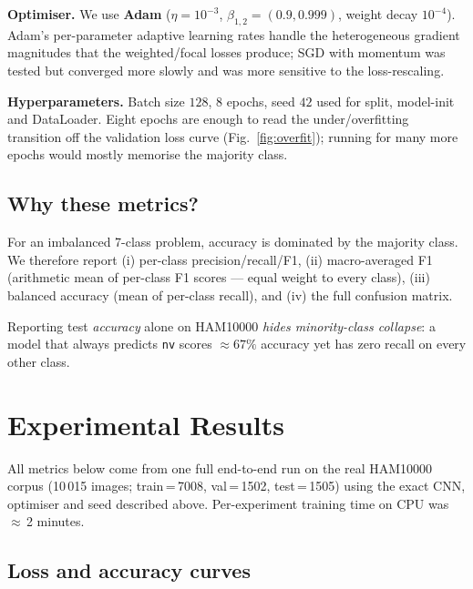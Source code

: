 \documentclass[11pt,a4paper]{article}
\theoremstyle{definition}
\begin{document}
\textbf{Optimiser.} We use \textbf{Adam} \cite{kingma2014adam}
($\eta=10^{-3}$, $\beta_{1{,}2}=(0.9,0.999)$, weight decay $10^{-4}$). Adam's
per-parameter adaptive learning rates handle the heterogeneous gradient
magnitudes that the weighted/focal losses produce; SGD with momentum was
tested but converged more slowly and was more sensitive to the loss-rescaling.

\textbf{Hyperparameters.} Batch size $128$, $8$ epochs, seed $42$ used for
split, model-init and DataLoader. Eight epochs are enough to read the
under/overfitting transition off the validation loss curve (Fig.~\ref{fig:overfit});
running for many more epochs would mostly memorise the majority class.

\subsection{Why these metrics?}

For an imbalanced 7-class problem, accuracy is dominated by the majority class.
We therefore report (i) per-class precision/recall/F1, (ii) macro-averaged F1
(arithmetic mean of per-class F1 scores --- equal weight to every class),
(iii) balanced accuracy (mean of per-class recall), and (iv) the full
confusion matrix.

\begin{warningbox}
Reporting test \emph{accuracy} alone on HAM10000 \emph{hides minority-class
collapse}: a model that always predicts \texttt{nv} scores $\approx 67\%$
accuracy yet has zero recall on every other class.
\end{warningbox}

\section{Experimental Results}

All metrics below come from one full end-to-end run on the real HAM10000
corpus (10\,015 images; train\,=\,7008, val\,=\,1502, test\,=\,1505) using the
exact CNN, optimiser and seed described above. Per-experiment training time
on CPU was $\approx$\,2 minutes.

\subsection{Loss and accuracy curves}
\end{document}
